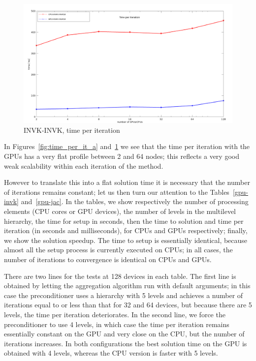 \begin{figure}[h!]
\centering
\includegraphics[width=1\textwidth]{graf_time_per_it3b.png}
\caption{INVK-INVK, time per iteration\label{fig:time_per_it_b}}
\end{figure}

In Figures~\ref{fig:time_per_it_a} and~\ref{fig:time_per_it_b}
we see that the time per iteration with the GPUs has a very flat profile between 2
and 64 nodes; this reflects a very good weak scalability within each
iteration of the method.

 However to translate this into a flat
solution time it is necessary that the number of iterations remains
constant; let us then turn our attention to the Tables~\ref{gpu-invk}
and~\ref{gpu-jac}. In the tables, we show 
respectively the number of processing elements (CPU cores or GPU
devices), the number of levels in the multilevel hierarchy, the time
for setup in seconds, then the time to solution and time per iteration
(in seconds and milliseconds), for CPUs and GPUs respectively; finally,
we show the solution speedup. The time 
to setup is essentially identical, because  almost all the
setup process is currently executed  on CPUs; in all cases, the number
of iterations to convergence is identical on CPUs and GPUs. 

There are two lines for the tests at 128 devices in each table. 
The first line is obtained by letting the aggregation algorithm run with
default arguments; in this case the preconditioner uses a hierarchy
with 5 levels and achieves a number of iterations equal to or less than
that for 32 and 64 devices, but because there are 5 levels, the time
per iteration deteriorates.  In the second line, we force the
preconditioner to use 4 levels, in which case the time per iteration
remains essentially constant on the GPU and very close on the CPU, but
the number of iterations increases. In both
configurations the best solution time on the GPU is obtained with 4
levels, whereas the CPU version is faster with 5 levels. 


